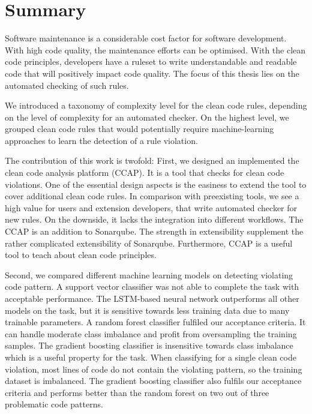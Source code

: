 \section{Summary}
Software maintenance is a considerable cost factor for software development. With high code quality, the maintenance efforts can be optimised. With the clean code principles, developers have a ruleset to write understandable and readable code that will positively impact code quality. The focus of this thesis lies on the automated checking of such rules.

We introduced a taxonomy of complexity level for the clean code rules, depending on the level of complexity for an automated checker. On the highest level, we grouped clean code rules that would potentially require machine-learning approaches to learn the detection of a rule violation. 

The contribution of this work is twofold: 
First, we designed an implemented the clean code analysis platform (CCAP). It is a tool that checks for clean code violations. One of the essential design aspects is the easiness to extend the tool to cover additional clean code rules. In comparison with preexisting tools, we see a high value for users and extension developers, that write automated checker for new rules. On the downside, it lacks the integration into different workflows. The CCAP is an addition to Sonarqube. The strength in extensibility supplement the rather complicated extensibility of Sonarqube. Furthermore, CCAP is a useful tool to teach about clean code principles.

Second, we compared different machine learning models on detecting violating code pattern. A support vector classifier was not able to complete the task with acceptable performance. The LSTM-based neural network outperforms all other models on the task, but it is sensitive towards less training data due to many trainable parameters.
A random forest classifier fulfiled our acceptance criteria. It can handle moderate class imbalance and profit from oversampling the training samples. The gradient boosting classifier is insensitive towards class imbalance which is a useful property for the task. When classifying for a single clean code violation, most lines of code do not contain the violating pattern, so the training dataset is imbalanced. The gradient boosting classifier also fulfils our acceptance criteria and performs better than the random forest on two out of three problematic code patterns.

